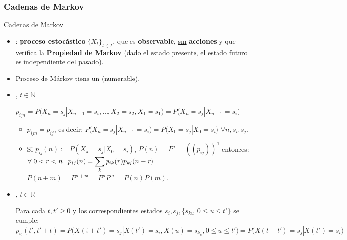 \documentclass[10pt, envcountsect, handout, aspectratio=1610, hyperref={hypertexnames=true}]{beamer}
\begin{document}
\subsubsection{Cadenas de Markov}


\begin{frame}{Cadenas de Markov}
\begin{itemize}

\item 
{}: \textbf{proceso estocástico} $\{X_t\}_{t\in T}$, 
que es  \textbf{observable}, 
\underline{sin} \textbf{acciones} y 
que verifica la \textbf{Propiedad de Markov} (dado el estado presente, el estado futuro es independiente del pasado).

\item 
{}  Proceso de Márkov tiene un  (numerable).


\item 
{}, $t\in \mathbb{N}$    

\hfil $p_{ijn}=P\Big(X_n=s_j | X_{n-1} = s_i, \ldots, X_2=s_2, X_1=s_1\Big) = P\Big(X_n=s_j | X_{n-1} = s_i \Big)$

    \begin{itemize} 
      	
	\item 
	 $p_{ijn}=p_{ij}$, es decir: 
		$P\Big(X_n=s_j | X_{n-1} = s_i \Big)=P\Big(X_1=s_j | X_{0} = s_i \Big)$ $\forall n, s_i, s_j$.
	
	\item 
	 Si $p_{ij}(n):=P(X_{n}=s_j|X_0=s_i)$, $P(n)=P^n=(\!(p_{ij})\!)^n$ entonces:\\
		\hfil $\displaystyle \forall \; 0<r<n \; \; \; p_{ij}(n) = \sum_k p_{ik}(r) p_{kj}(n-r)$
		\hspace{0.5cm}
		$P(n+m)=P^{n+m}=P^nP^m=P(n)P(m)$. 
    \end{itemize}

\item 
{}, $t\in \mathbb{R}$

Para cada $t, t'\geq 0$ y  los correspondientes estados $s_i, s_j, \{s_{ku}|\ 0\leq u \leq t'\}$ se cumple:\\
\hfil $
p_{ij}(t', t'+t) = P\Big( X(t+t')=s_j | X(t') = s_i, X(u)=s_{k_u}, 0\leq u \leq t' \Big) = P\Big( X(t+t')=s_j|X(t')=s_i \Big) $


\end{itemize}
\end{frame}
\end{document}

